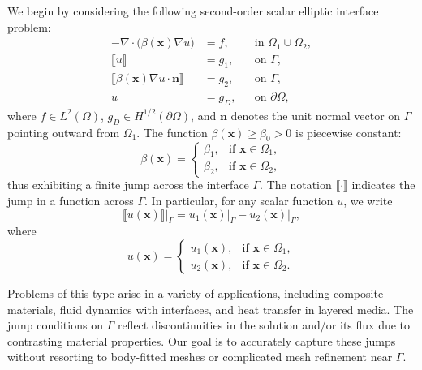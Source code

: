 \documentclass{article}
\begin{document}
We begin by considering the following second-order scalar elliptic interface problem:
\begin{equation}\label{modelpextenddnn}
\begin{aligned}
-\nabla \cdot \bigl(\beta(\boldsymbol{x}) \nabla u\bigr) & = f, & & \text{in } \Omega_1 \cup \Omega_2, \\
\llbracket u \rrbracket & = g_1, & & \text{on } \Gamma, \\
\llbracket \beta(\boldsymbol{x}) \nabla u \cdot \boldsymbol{n} \rrbracket & = g_2, & & \text{on } \Gamma, \\
u & = g_D, & & \text{on } \partial \Omega,
\end{aligned}
\end{equation}
where $f \in L^2(\Omega)$, $g_D \in H^{1/2}(\partial \Omega)$, and $\boldsymbol{n}$ denotes the unit normal vector on $\Gamma$ pointing outward from $\Omega_1$. The function $\beta(\boldsymbol{x}) \ge \beta_0 > 0$ is piecewise constant:
\[
\beta(\boldsymbol{x}) = 
\begin{cases}
\beta_1, & \text{if } \boldsymbol{x} \in \Omega_1,\\
\beta_2, & \text{if } \boldsymbol{x} \in \Omega_2,
\end{cases}
\]
thus exhibiting a finite jump across the interface $\Gamma$. The notation $\llbracket \cdot \rrbracket$ indicates the jump in a function across $\Gamma$. In particular, for any scalar function $u$, we write
\[
\left.\llbracket u(\boldsymbol{x}) \rrbracket\right|_{\Gamma}
= \left.u_1(\boldsymbol{x})\right|_{\Gamma} - \left.u_2(\boldsymbol{x})\right|_{\Gamma},
\]
where
\[
u(\boldsymbol{x})=
\begin{cases}
u_1(\boldsymbol{x}), & \text{if } \boldsymbol{x} \in \Omega_1,\\
u_2(\boldsymbol{x}), & \text{if } \boldsymbol{x} \in \Omega_2.
\end{cases}
\]

Problems of this type arise in a variety of applications, including composite materials, fluid dynamics with interfaces, and heat transfer in layered media. The jump conditions on $\Gamma$ reflect discontinuities in the solution and/or its flux due to contrasting material properties. Our goal is to accurately capture these jumps without resorting to body-fitted meshes or complicated mesh refinement near $\Gamma$.
\end{document}

